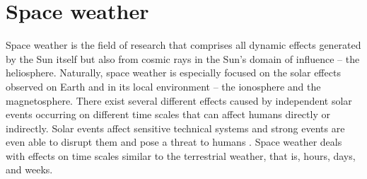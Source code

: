 




%
%
%


\clearpage

\section{Space weather}
\label{sec:space_weather}
Space weather is the field of research that comprises all dynamic effects generated by the Sun itself but also from cosmic rays in
the Sun's domain of influence -- the heliosphere. Naturally, space weather is especially focused on the solar effects observed on Earth and in its local environment -- the ionosphere and the magnetosphere. There exist several different effects caused by independent solar events occurring on different time scales that can affect humans directly or indirectly. Solar events affect sensitive technical systems and strong events are even able to disrupt them and pose a threat to humans \citep{Bothmer2007}. Space weather deals with effects on time scales similar to the terrestrial weather, that is, hours, days, and weeks.

